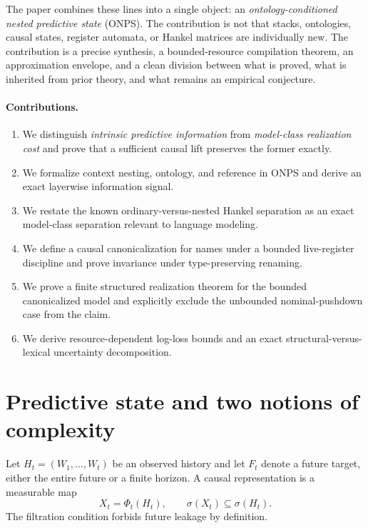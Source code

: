 \documentclass[11pt]{article}
\begin{document}
The paper combines these lines into a single object: an \emph{ontology-conditioned nested predictive state} (ONPS). The contribution is not that stacks, ontologies, causal states, register automata, or Hankel matrices are individually new. The contribution is a precise synthesis, a bounded-resource compilation theorem, an approximation envelope, and a clean division between what is proved, what is inherited from prior theory, and what remains an empirical conjecture.

\paragraph{Contributions.}\label{contributions.}

\begin{enumerate}
\def\labelenumi{\arabic{enumi}.}
\item
  We distinguish \emph{intrinsic predictive information} from \emph{model-class realization cost} and prove that a sufficient causal lift preserves the former exactly.
\item
  We formalize context nesting, ontology, and reference in ONPS and derive an exact layerwise information signal.
\item
  We restate the known ordinary-versus-nested Hankel separation as an exact model-class separation relevant to language modeling.
\item
  We define a causal canonicalization for names under a bounded live-register discipline and prove invariance under type-preserving renaming.
\item
  We prove a finite structured realization theorem for the bounded canonicalized model and explicitly exclude the unbounded nominal-pushdown case from the claim.
\item
  We derive resource-dependent log-loss bounds and an exact structural-versus-lexical uncertainty decomposition.
\end{enumerate}

\section{Predictive state and two notions of complexity}\label{predictive-state-and-two-notions-of-complexity}

Let \(H_t=(W_1,\ldots,W_t)\) be an observed history and let \(F_t\) denote a future target, either the entire future or a finite horizon. A causal representation is a measurable map \[X_t=\Phi_t(H_t),
\qquad
\sigma(X_t)\subseteq\sigma(H_t).\] The filtration condition forbids future leakage by definition.
\end{document}
